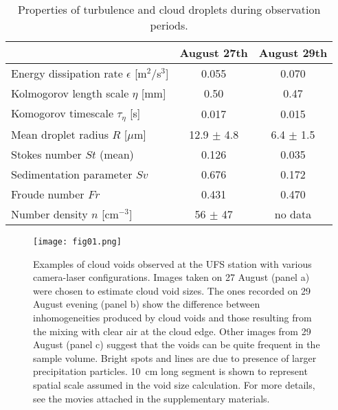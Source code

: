\documentclass[../main.tex]{subfiles}
\begin{document}
\begin{table}
\small
\tabcolsep=0.2cm
\caption{Properties of turbulence and cloud droplets during observation periods.}
\centering
\begin{tabular}{|l|c|c|}
\hline
  & August 27th & August 29th\\
\hline
 Energy dissipation rate $\epsilon$ [m$^2$/s$^3$] & 0.055 & 0.070 \\
\hline
 Kolmogorov length scale $\eta$ [mm] & 0.50  & 0.47\\
\hline
Komogorov timescale $\tau_{\eta}$ [s] & 0.017 & 0.015\\
\hline
 Mean droplet radius $R$ [$\mu$m] & 12.9 $\pm$ 4.8 & 6.4 $\pm$ 1.5\\
\hline
 Stokes number $St$ (mean) & 0.126  & 0.035\\
\hline
 Sedimentation parameter $Sv$ & 0.676  & 0.172\\
 \hline
 Froude number $Fr$ & 0.431  & 0.470\\
 \hline
 Number density $n$ [cm$^{-3}$] & 56 $\pm$ 47 & no data\\
 \hline
\end{tabular}
\label{tab:ch4_1}
\end{table}

\begin{figure}[h]
\centering
\noindent\texttt{[image: fig01.png]}
\caption{Examples of cloud voids observed at the UFS station with various camera-laser configurations. Images taken on 27 August (panel a) were chosen to estimate cloud void sizes. The ones recorded on 29 August evening (panel b) show the difference between inhomogeneities produced by cloud voids and those resulting from the mixing with clear air at the cloud edge. Other images from 29 August (panel c) suggest that the voids can be quite frequent in the sample volume. Bright spots and lines are due to presence of larger precipitation particles. 10~cm long segment is shown to represent spatial scale assumed in the void size calculation. For more details, see the movies attached in the supplementary materials.}
\label{fig:ch4_3}
\end{figure}
\end{document}
